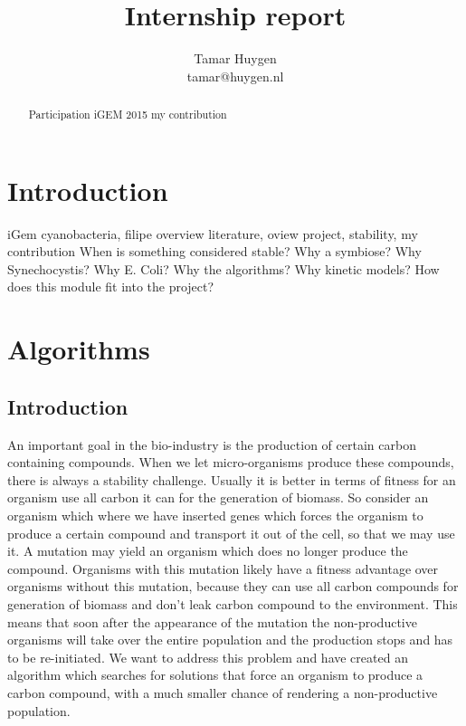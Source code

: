 \documentclass[12pt]{report}
\title{Internship report}
\author{Tamar Huygen \\ tamar@huygen.nl}
\begin{document}
\maketitle

\begin{abstract}
  Participation iGEM 2015 my contribution
\end{abstract}

\chapter{Introduction}
iGem cyanobacteria, filipe overview literature,
oview project, stability, my contribution
When is something considered stable?
Why a symbiose?
Why Synechocystis?
Why E. Coli?
Why the algorithms?
Why kinetic models?
How does this module fit into the project?

\chapter{Algorithms}

\begin{abstract}
  
\end{abstract}

\section{Introduction}
An important goal in the bio-industry is the production of certain carbon containing compounds. When we let micro-organisms produce these compounds, there is always a stability challenge. Usually it is better in terms of fitness for an organism use all carbon it can for the generation of biomass. So consider an organism which where we have inserted genes which forces the organism to produce a certain compound and transport it out of the cell, so that we may use it. A mutation may yield an organism which does no longer produce the compound. Organisms with this mutation likely have a fitness advantage over organisms without this mutation, because they can use all carbon compounds for generation of biomass and don't leak carbon compound to the environment. This means that soon after the appearance of the mutation the non-productive organisms will take over the entire population and the production stops and has to be re-initiated. We want to address this problem and have created an algorithm which searches for solutions that force an organism to produce a carbon compound, with a much smaller chance of rendering a non-productive population.
\end{document}
